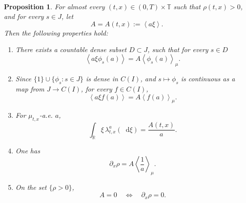 \documentclass[a4paper,twosided,11pt]{article}
\newcommand{\R}{\mathbb{R}}
\newcommand{\T}{\mathbb{T}}
\newcommand{\av}[1]{\left\langle #1 \right\rangle}
\newcommand{\avmu}[1]{\left\langle #1 \right\rangle_{\mu}}
\newcommand{\1}{\mathbf{1}}
\theoremstyle{plain}
\newtheorem{proposition}[thm]{Proposition}
\theoremstyle{remark}
\newcommand{\diff}{\mathop{} \mathrm{d}}
\numberwithin{equation}{section}
\begin{document}
\begin{proposition}
\label{prop:first-hit}
For almost every $(t,x)\in(0,T)\times\T$ such that $\rho(t,x)>0$, and for every $s\in J$, let
$$
A=A(t,x):=\av{a\xi}.
$$
Then the following properties hold:
\begin{enumerate}
    \item There exists a countable dense subset $D\subset J$, such that for every $s\in D$ 
    \begin{equation}
    \label{eq:first-hit-entropy}
        \av{a\xi \phi_s(a)}
        = A \avmu{\phi_s(a)}.
    \end{equation}

    \item Since $\{1\}\cup\{\phi_s:s\in J\}$ is dense in $C(I)$, and $s\mapsto \phi_s$ is continuous as a map from $J\to C(I)$, for every $f\in C(I)$,
    \begin{equation}
    \label{eq:first-hit-allf}
        \av{a\xi f(a)}
        = A \avmu{f(a)}.
    \end{equation}

    \item For $\mu_{t,x}$-a.e. $a$,
    \begin{equation}
    \label{eq:conditional-xi}
        \int_{\R}\xi\,\lambda^a_{t,x}(\diff\xi)=\frac{A(t,x)}{a}.
    \end{equation}

    \item One has
    \begin{equation}
    \label{eq:rhox-A}
        \partial_x\rho = A \avmu{\frac1a}.
    \end{equation}

    \item On the set $\{\rho>0\}$,
    \begin{equation}
    \label{eq:Aiff}
        A=0 \quad \Longleftrightarrow \quad \partial_x\rho=0.
    \end{equation}
\end{enumerate}
\end{proposition}
 
\end{document}

